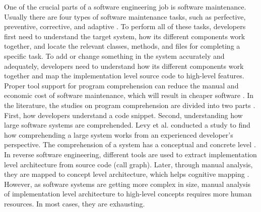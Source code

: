 One of the crucial parts of a software engineering job is software maintenance. Usually there are four types of software maintenance tasks, such as 
 perfective, preventive, corrective, and adaptive \cite{williams2010characterizingArchitectureChanges}. To perform all of these tasks, developers first need to understand the target system, how its different components work together, and locate the relevant classes, methods, and files for completing a specific task. To add or change something in the system accurately and adequately, developers need to understand how its different components work together and map the implementation level source code to high-level features. Proper tool support for program comprehension can reduce the manual and economic cost of software maintenance, which will result in cheaper software \cite{arisholm2006impactUMLDocumentation}. In the literature, the studies on program comprehension are divided into two parts \cite{levy2019understandingLargeHierarchical}. First, how developers understand a code snippet. Second, understanding how large software systems are comprehended. Levy et al. \cite{levy2019understandingLargeHierarchical} conducted a study to find how comprehending a large system works from an experienced developer's perspective. The comprehension of a system has a conceptual and concrete level \cite{bass2003softwareArchitecturePractice, levy2019understandingLargeHierarchical}. In reverse software engineering, different tools are used to extract implementation level architecture from source code (call graph). Later, through manual analysis, they are mapped to concept level architecture, which helps cognitive mapping \cite{roy2008softwareArchitectureRecovery}. However, as software systems are getting more complex in size, manual analysis of implementation level architecture to high-level concepts requires more human resources. In most cases, they are exhausting. 

